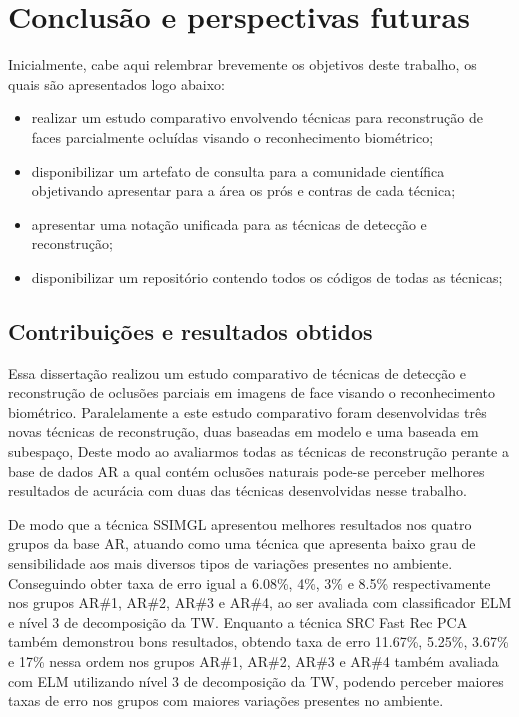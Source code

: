 \chapter{Conclusão e perspectivas futuras}
\label{cp:9_Considerações Finais}

Inicialmente, cabe aqui relembrar brevemente os objetivos deste trabalho, os quais são apresentados logo abaixo:

\begin{itemize}
\item realizar um estudo comparativo envolvendo técnicas para reconstrução de faces parcialmente ocluídas visando o reconhecimento biométrico;
\item disponibilizar um artefato de consulta para a comunidade científica objetivando apresentar para a área os prós e contras de cada técnica;
\item apresentar uma notação unificada para as técnicas de detecção e reconstrução;
\item disponibilizar um repositório contendo todos os códigos de todas as técnicas;

\end{itemize}

\section{Contribuições e resultados obtidos}
Essa dissertação realizou um estudo comparativo de técnicas de detecção e reconstrução de oclusões parciais em imagens de face visando o reconhecimento biométrico. Paralelamente a este estudo comparativo foram desenvolvidas três novas técnicas de reconstrução, duas baseadas em modelo e uma baseada em subespaço, Deste modo ao avaliarmos todas as técnicas de reconstrução perante a base de dados AR a qual contém oclusões naturais pode-se perceber melhores resultados de acurácia com duas das técnicas desenvolvidas nesse trabalho.

De modo que a técnica SSIMGL apresentou melhores resultados nos quatro grupos da base AR, atuando como uma técnica que apresenta baixo grau de sensibilidade aos mais diversos tipos de variações presentes no ambiente. Conseguindo obter taxa de erro igual a 6.08\%, 4\%, 3\% e 8.5\% respectivamente nos grupos AR\#1, AR\#2, AR\#3 e AR\#4, ao ser avaliada com classificador ELM e nível 3 de decomposição da TW. Enquanto a técnica SRC Fast Rec PCA também demonstrou bons resultados, obtendo taxa de erro  11.67\%, 5.25\%, 3.67\% e 17\% nessa ordem nos grupos AR\#1, AR\#2, AR\#3 e AR\#4 também avaliada com ELM utilizando nível 3 de decomposição da TW, podendo perceber maiores taxas de erro nos grupos com maiores variações presentes no ambiente.

